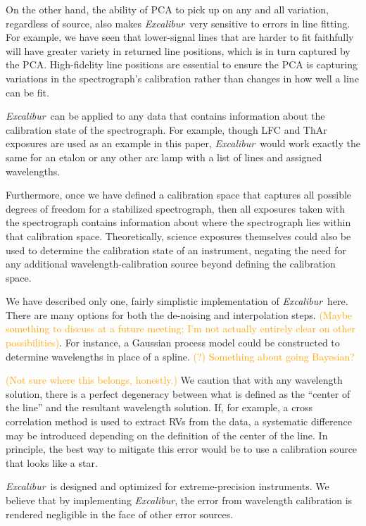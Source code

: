 \documentclass[twocolumn]{aastex63}
\newcommand{\lz}[1]{\textcolor{orange}{#1}}
\newcommand{\project}[1]{\textsl{#1}}
\newcommand{\name}{\project{Excalibur}}
\begin{document}
On the other hand, the ability of PCA to pick up on any and all variation, regardless of source, also makes \name\ very sensitive to errors in line fitting.  For example, we have seen that lower-signal lines that are harder to fit faithfully will have greater variety in returned line positions, which is in turn captured by the PCA.  High-fidelity line positions are essential to ensure the PCA is capturing variations in the spectrograph's calibration rather than changes in how well a line can be fit.

\name\ can be applied to any data that contains information about the calibration state of the spectrograph.  For example, though LFC and ThAr exposures are used as an example in this paper, \name\ would work exactly the same for an etalon or any other arc lamp with a list of lines and assigned wavelengths.

Furthermore, once we have defined a calibration space that captures all possible degrees of freedom for a stabilized spectrograph, then all exposures taken with the spectrograph contains information about where the spectrograph lies within that calibration space.  Theoretically, science exposures themselves could also be used to determine the calibration state of an instrument, negating the need for any additional wavelength-calibration source beyond defining the calibration space.

We have described only one, fairly simplistic implementation of \name\ here.  There are many options for both the de-noising and interpolation steps.  \lz{(Maybe something to discuss at a future meeting; I'm not actually entirely clear on other possibilities)}.  For instance, a Gaussian process model could be constructed to determine wavelengths in place of a spline. \lz{(?)}  \lz{Something about going Bayesian?}

\lz{(Not sure where this belongs, honestly.)}  We caution that with any wavelength solution, there is a perfect degeneracy between what is defined as the ``center of the line'' and the resultant wavelength solution.  If, for example, a cross correlation method is used to extract RVs from the data, a systematic difference may be introduced depending on the definition of the center of the line.  In principle, the best way to mitigate this error would be to use a calibration source that looks like a star.

\name\ is designed and optimized for extreme-precision instruments.  We believe that by implementing \name, the error from wavelength calibration is rendered negligible in the face of other error sources.





\end{document}
